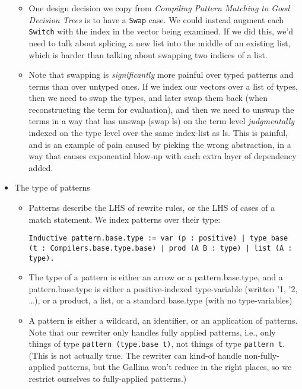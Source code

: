 \begin{itemize}
  \begin{itemize}
  \tightlist
  \item
    One design decision we copy from \emph{Compiling Pattern Matching to
    Good Decision Trees} is to have a \texttt{Swap} case. We could
    instead augment each \texttt{Switch} with the index in the vector
    being examined. If we did this, we'd need to talk about splicing a
    new list into the middle of an existing list, which is harder than
    talking about swapping two indices of a list.
  \item
    Note that swapping is \emph{significantly} more painful over typed
    patterns and terms than over untyped ones. If we index our vectors
    over a list of types, then we need to swap the types, and later swap
    them back (when reconstructing the term for evaluation), and then we
    need to unswap the terms in a way that has unswap (swap ls) on the
    term level \emph{judgmentally} indexed on the type level over the
    same index-list as ls. This is painful, and is an example of pain
    caused by picking the wrong abstraction, in a way that causes
    exponential blow-up with each extra layer of dependency added.
  \end{itemize}
\item
  The type of patterns

  \begin{itemize}
  \item
    Patterns describe the LHS of rewrite rules, or the LHS of cases of a
    match statement. We index patterns over their type:

\begin{verbatim}
Inductive pattern.base.type := var (p : positive) | type_base (t : Compilers.base.type.base) | prod (A B : type) | list (A : type).
\end{verbatim}
  \item
    The type of a pattern is either an arrow or a pattern.base.type, and
    a pattern.base.type is either a positive-indexed type-variable
    (written '1, '2, \ldots), or a product, a list, or a standard
    base.type (with no type-variables)
  \item
    A pattern is either a wildcard, an identifier, or an application of
    patterns. Note that our rewriter only handles fully applied
    patterns, i.e., only things of type
    \texttt{pattern\ (type.base\ t)}, not things of type
    \texttt{pattern\ t}. (This is not actually true. The rewriter can
    kind-of handle non-fully-applied patterns, but the Gallina won't
    reduce in the right places, so we restrict ourselves to
    fully-applied patterns.)


\end{itemize}
\end{itemize}
